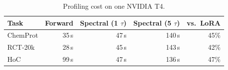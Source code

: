 \begin{table}[t]
\centering
\caption{Profiling cost on one NVIDIA T4.}
\label{tab:cost}
\small
\setlength{\tabcolsep}{4pt}
\begin{tabular}{lrrrr}
\toprule
Task & Forward & Spectral (1 $\tau$) & Spectral (5 $\tau$) & vs.\ LoRA \\
\midrule
ChemProt & 35\,s & 47\,s & 140\,s & 45\% \\
RCT-20k & 28\,s & 45\,s & 143\,s & 42\% \\
HoC & 99\,s & 47\,s & 136\,s & 47\% \\
\bottomrule
\end{tabular}
\end{table}
